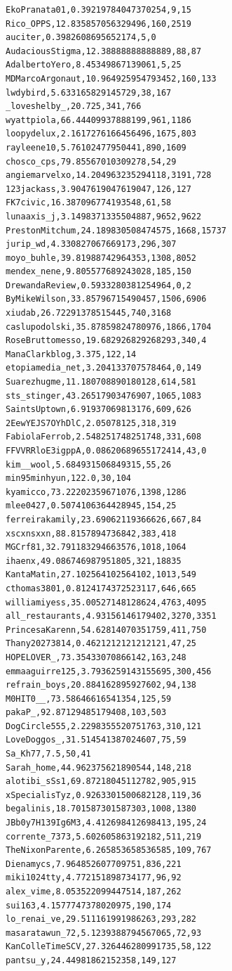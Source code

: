 \begin{verbatim}
EkoPranata01,0.39219784047370254,9,15
Rico_OPPS,12.835857056329496,160,2519
auciter,0.3982608695652174,5,0
AudaciousStigma,12.38888888888889,88,87
AdalbertoYero,8.45349867139061,5,25
MDMarcoArgonaut,10.964925954793452,160,133
lwdybird,5.633165829145729,38,167
_loveshelby_,20.725,341,766
wyattpiola,66.44409937888199,961,1186
loopydelux,2.1617276166456496,1675,803
rayleene10,5.76102477950441,890,1609
chosco_cps,79.85567010309278,54,29
angiemarvelxo,14.204963235294118,3191,728
123jackass,3.9047619047619047,126,127
FK7civic,16.387096774193548,61,58
lunaaxis_j,3.1498371335504887,9652,9622
PrestonMitchum,24.189830508474575,1668,15737
jurip_wd,4.330827067669173,296,307
moyo_buhle,39.81988742964353,1308,8052
mendex_nene,9.805577689243028,185,150
DrewandaReview,0.5933280381254964,0,2
ByMikeWilson,33.85796715490457,1506,6906
xiudab,26.72291378515445,740,3168
caslupodolski,35.87859824780976,1866,1704
RoseBruttomesso,19.682926829268293,340,4
ManaClarkblog,3.375,122,14
etopiamedia_net,3.204133707578464,0,149
Suarezhugme,11.180708890180128,614,581
sts_stinger,43.26517903476907,1065,1083
SaintsUptown,6.91937069813176,609,626
2EewYEJS7OYhDlC,2.05078125,318,319
FabiolaFerrob,2.548251748251748,331,608
FFVVRRloE3igppA,0.08620689655172414,43,0
kim__wool,5.684931506849315,55,26
min95minhyun,122.0,30,104
kyamicco,73.22202359671076,1398,1286
mlee0427,0.5074106364428945,154,25
ferreirakamily,23.69062119366626,667,84
xscxnsxxn,88.8157894736842,383,418
MGCrf81,32.791183294663576,1018,1064
ihaenx,49.086746987951805,321,18835
KantaMatin,27.102564102564102,1013,549
cthomas3801,0.8124174372523117,646,665
williamiyess,35.00527148128624,4763,4095
all_restaurants,4.93156146179402,3270,3351
PrincesaKarenn,54.62814070351759,411,750
Thany20273814,0.4621212121212121,47,25
HOPELOVER_,73.35433070866142,163,248
emmaaguirre125,3.7936259143155695,300,456
refrain_boys,20.884162895927602,94,138
M0HIT0__,73.58646616541354,125,59
pakaP_,92.87129485179408,103,503
DogCircle555,2.2298355520751763,310,121
LoveDoggos_,31.514541387024607,75,59
Sa_Kh77,7.5,50,41
Sarah_home,44.962375621890544,148,218
alotibi_sSs1,69.87218045112782,905,915
xSpecialisTyz,0.9263301500682128,119,36
begalinis,18.701587301587303,1008,1380
JBb0y7H139Ig6M3,4.412698412698413,195,24
corrente_7373,5.602605863192182,511,219
TheNixonParente,6.265853658536585,109,767
Dienamycs,7.964852607709751,836,221
miki1024tty,4.772151898734177,96,92
alex_vime,8.053522099447514,187,262
sui163,4.1577747378020975,190,174
lo_renai_ve,29.511161991986263,293,282
masaratawun_72,5.1239388794567065,72,93
KanColleTimeSCV,27.326446280991735,58,122
pantsu_y,24.44981862152358,149,127

\end{verbatim}
